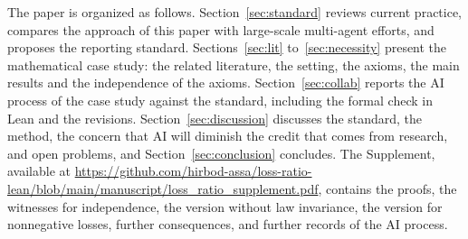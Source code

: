 The paper is organized as follows. Section~\ref{sec:standard} reviews current practice, compares the approach of
this paper with large-scale multi-agent efforts, and proposes the reporting standard. Sections~\ref{sec:lit}
to~\ref{sec:necessity} present the mathematical case study: the related literature, the setting, the axioms, the
main results and the independence of the axioms. Section~\ref{sec:collab} reports the AI process of the case study
against the standard, including the formal check in Lean and the revisions. Section~\ref{sec:discussion} discusses the standard, the method, the concern
that AI will diminish the credit that comes from research, and open problems, and Section~\ref{sec:conclusion} concludes. The Supplement, available at
\url{https://github.com/hirbod-assa/loss-ratio-lean/blob/main/manuscript/loss_ratio_supplement.pdf}, contains the proofs, the witnesses for independence, the version without law invariance, the
version for nonnegative losses, further consequences, and further records of the AI process.
